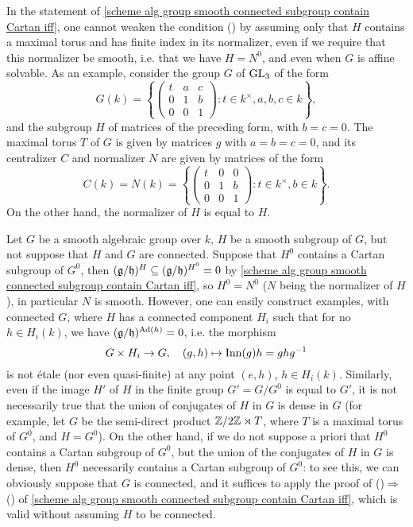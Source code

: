 \begin{example}
In the statement of \cref{scheme alg group smooth connected subgroup contain Cartan iff}, one cannot weaken the condition () by assuming only that $H$ contains a maximal torus and has finite index in its normalizer, even if we require that this normalizer be smooth, i.e. that we have $H=N^0$, and even when $G$ is affine solvable. As an example, consider the group $G$ of $\mathrm{GL}_3$ of the form
\[G(k)=\left\{\begin{pmatrix}
t&a&c\\
0&1&b\\
0&0&1
\end{pmatrix}:t\in k^\times,a,b,c\in k\right\},\]
and the subgroup $H$ of matrices of the preceding form, with $b=c=0$. The maximal torus $T$ of $G$ is given by matrices $g$ with $a=b=c=0$, and its centralizer $C$ and normalizer $N$ are given by matrices of the form
\[C(k)=N(k)=\left\{\begin{pmatrix}
t&0&0\\
0&1&b\\
0&0&1
\end{pmatrix}:t\in k^\times,b\in k\right\}.\]
On the other hand, the normalizer of $H$ is equal to $H$.
\end{example}

\begin{remark}
Let $G$ be a smooth algebraic group over $k$, $H$ be a smooth subgroup of $G$, but not suppose that $H$ and $G$ are connected. Suppose that $H^0$ contains a Cartan subgroup of $G^0$, then $(\mathfrak{g}/\mathfrak{h})^H\subseteq(\mathfrak{g}/\mathfrak{h})^{H^0}=0$ by \cref{scheme alg group smooth connected subgroup contain Cartan iff}, so $H^0=N^0$ ($N$ being the normalizer of $H$), in particular $N$ is smooth. However, one can easily construct examples, with connected $G$, where $H$ has a connected component $H_i$ such that for no $h\in H_i(k)$, we have $(\mathfrak{g}/\mathfrak{h})^{\mathrm{Ad}(h)}=0$, i.e. the morphism
\[G\times H_i\to G,\quad (g,h)\mapsto \mathrm{Inn}(g)h=ghg^{-1}\]
is not \'etale (nor even quasi-finite) at any point $(e,h)$, $h\in H_i(k)$. Similarly, even if the image $H'$ of $H$ in the finite group $G'=G/G^0$ is equal to $G'$, it is not necessarily true that the union of conjugates of $H$ in $G$ is dense in $G$ (for example, let $G$ be the semi-direct product $\mathbb{Z}/2\mathbb{Z}\rtimes T$, where $T$ is a maximal torus of $G^0$, and $H=G^0$). On the other hand, if we do not suppose a priori that $H^0$ contains a Cartan subgroup of $G^0$, but the union of the conjugates of $H$ in $G$ is dense, then $H^0$ necessarily contains a Cartan subgroup of $G^0$: to see this, we can obviously suppose that $G$ is connected, and it suffices to apply the proof of ()$\Rightarrow$() of \cref{scheme alg group smooth connected subgroup contain Cartan iff}, which is valid without assuming $H$ to be connected.
\end{remark}


